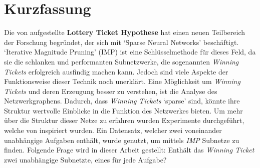 \chapter*{Kurzfassung}

Die von \textcite{LTH} aufgestellte \textbf{Lottery Ticket Hypothese} hat einen neuen Teilbereich der Forschung begründet, der sich mit `Sparse Neural Networks' beschäftigt.
`Iterative Magnitude Pruning' (IMP) ist eine Schlüsselmethode für dieses Feld, da sie die schlanken und performanten Subnetzwerke, die sogenannten \textit{Winning Tickets} erfolgreich ausfindig machen kann.
Jedoch sind viele Aspekte der Funktionsweise dieser Technik noch unerklärt.
Eine Möglichkeit um \textit{Winning Tickets} und deren Erzeugung besser zu verstehen, ist die Analyse des Netzwerkgraphens.
Dadurch, dass \textit{Winning Tickets} `sparse' sind, könnte ihre Struktur wertvolle Einblicke in die Funktion des Netzwerkes bieten.
Um mehr über die Struktur dieser Netze zu erfahren wurden Experimente durchgeführt, welche von \textcite{BIMT} inspiriert wurden.
Ein Datensatz, welcher zwei voneinander unabhängige Aufgaben enthält, wurde genutzt, um mittels \textit{IMP} Subnetze zu finden.
Folgende Frage wird in dieser Arbeit gestellt:
Enthält das \textit{Winning Ticket} zwei unabhängige Subnetzte, eines für jede Aufgabe?